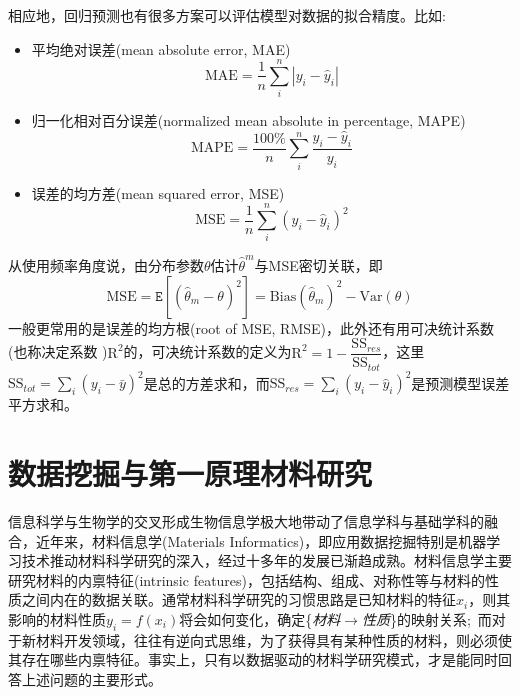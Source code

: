 \documentclass[10pt, oneside, a4paper]{article}      %
\newcommand{\upcite}[1]{\hspace{0ex}\textsuperscript{\cite{#1}}} %
\begin{document}
相应地，回归预测也有很多方案可以评估模型对数据的拟合精度。比如:
\begin{itemize}
	\item 平均绝对误差\textrm{(mean absolute error, MAE)}
		\begin{displaymath}
			\mathrm{MAE}=\dfrac1n\sum_i^n|y_i-\hat{y}_i|
		\end{displaymath}
	\item 归一化相对百分误差\textrm{(normalized mean absolute in percentage, MAPE)}
		\begin{displaymath}
			\mathrm{MAPE}=\dfrac{100\%}n\sum_i^n\dfrac{y_i-\hat{y}_i}{y_i}
		\end{displaymath}
	\item 误差的均方差\textrm{(mean squared error, MSE)}
		\begin{displaymath}
			\mathrm{MSE}=\dfrac1n\sum_i^n(y_i-\hat{y}_i)^2
		\end{displaymath} 
\end{itemize}
从使用频率角度说，由分布参数$\theta$估计$\hat{\theta}^m$与\textrm{MSE}密切关联，即
		\begin{displaymath}
			\mathrm{MSE}=\mathtt{E}[(\hat{\theta}_m-\theta)^2]=\mathrm{Bias}(\hat{\theta}_m)^2-\mathrm{Var}(\theta)
		\end{displaymath} 
		一般更常用的是误差的均方根\textrm{(root of MSE, RMSE)}，此外还有用可决统计系数(也称决定系数%
)$\mathrm{R}^2$的，可决统计系数的定义为$\mathrm{R}^2=1-\dfrac{\mathrm{SS}_{res}}{\mathrm{SS}_{tot}}$，这里$\mathrm{SS}_{tot}=\sum\limits_i(y_i-\bar{y})^2$是总的方差求和，而$\mathrm{SS}_{res}=\sum\limits_i(y_i-\hat{y}_i)^2$是预测模型误差平方求和。


\section{数据挖掘与第一原理材料研究}
信息科学与生物学的交叉形成生物信息学极大地带动了信息学科与基础学科的融合，近年来，材料信息学\textrm{(Materials Informatics)}，即应用数据挖掘特别是机器学习技术推动材料科学研究的深入，经过十多年的发展已渐趋成熟\upcite{MT8-38_2005}。材料信息学主要研究材料的内禀特征\textrm{(intrinsic features)}，包括结构、组成、对称性等与材料的性质之间内在的数据关联。通常材料科学研究的习惯思路是已知材料的特征$x_i$，则其影响的材料性质$y_i=f(x_i)$将会如何变化，确定\{\textit{材料}$\rightarrow$\textit{性质}\}的映射关系;~而对于新材料开发领域，往往有逆向式思维，为了获得具有某种性质的材料，则必须使其存在哪些内禀特征。事实上，只有以数据驱动的材料学研究模式，才是能同时回答上述问题的主要形式。
\end{document}
